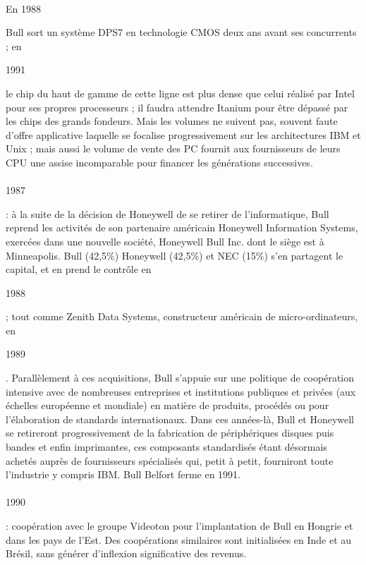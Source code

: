 \documentclass{article}
\begin{document}
		\paragraph{}
		\begin{bf}En 1988\end{bf} Bull sort un système DPS7 en technologie CMOS deux ans avant ses concurrents ; en 
		\begin{bf}1991\end{bf} le chip du haut de gamme de cette ligne est plus dense que celui réalisé par Intel pour ses 
		propres processeurs ; il faudra attendre Itanium pour être dépassé par les chips des grands fondeurs. Mais les volumes 
		ne suivent pas, souvent faute d’offre applicative laquelle se focalise progressivement sur les architectures IBM et 
		Unix ; mais aussi le volume de vente des PC fournit aux fournisseurs de leurs CPU une assise incomparable pour 
		financer les générations successives.
		\paragraph{}
		\begin{bf}1987\end{bf}: à la suite de la décision de Honeywell de se retirer de l’informatique, Bull reprend les 
		activités de son partenaire américain Honeywell Information Systems, exercées dans une nouvelle société, Honeywell 
		Bull Inc. dont le siège est à Minneapolis. Bull (42,5\%) Honeywell (42,5\%) et NEC (15\%) s'en partagent le capital, 
		et en prend le contrôle en \begin{bf}1988\end{bf} ; tout comme Zenith Data Systems, constructeur américain de 
		micro-ordinateurs, en \begin{bf}1989\end{bf}. Parallèlement à ces acquisitions, Bull s’appuie sur une politique de 
		coopération intensive avec de nombreuses entreprises et institutions publiques et privées (aux échelles européenne et 
		mondiale) en matière de produits, procédés ou pour l’élaboration de standards internationaux.\newline{}
		Dans ces années-là, Bull et Honeywell se retireront progressivement de la fabrication de périphériques disques puis 
		bandes et enfin imprimantes, ces composants standardisés étant désormais achetés auprès de fournisseurs spécialisés 
		qui, petit à petit, fourniront toute l’industrie y compris IBM. Bull Belfort ferme en 1991.
		\paragraph{}
		\begin{bf}1990\end{bf}: coopération avec le groupe Videoton pour l’implantation de Bull en Hongrie et dans les pays 
		de l’Est. Des coopérations similaires sont initialisées en Inde et au Brésil, sans générer d’inflexion significative 
		des revenus. 
\end{document}
